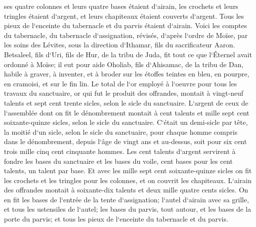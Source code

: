 \verse ses quatre colonnes et leurs quatre bases étaient d`airain, les crochets et leurs tringles étaient d`argent, et leurs chapiteaux étaient couverts d`argent. 
\verse Tous les pieux de l`enceinte du tabernacle et du parvis étaient d`airain. 
\verse Voici les comptes du tabernacle, du tabernacle d`assignation, révisés, d`après l`ordre de Moïse, par les soins des Lévites, sous la direction d`Ithamar, fils du sacrificateur Aaron. 
\verse Betsaleel, fils d`Uri, fils de Hur, de la tribu de Juda, fit tout ce que l`Éternel avait ordonné à Moïse; 
\verse il eut pour aide Oholiab, fils d`Ahisamac, de la tribu de Dan, habile à graver, à inventer, et à broder sur les étoffes teintes en bleu, en pourpre, en cramoisi, et sur le fin lin. 
\verse Le total de l`or employé à l`oeuvre pour tous les travaux du sanctuaire, or qui fut le produit des offrandes, montait à vingt-neuf talents et sept cent trente sicles, selon le sicle du sanctuaire. 
\verse L`argent de ceux de l`assemblée dont on fit le dénombrement montait à cent talents et mille sept cent soixante-quinze sicles, selon le sicle du sanctuaire. 
\verse C`était un demi-sicle par tête, la moitié d`un sicle, selon le sicle du sanctuaire, pour chaque homme compris dans le dénombrement, depuis l`âge de vingt ans et au-dessus, soit pour six cent trois mille cinq cent cinquante hommes. 
\verse Les cent talents d`argent servirent à fondre les bases du sanctuaire et les bases du voile, cent bases pour les cent talents, un talent par base. 
\verse Et avec les mille sept cent soixante-quinze sicles on fit les crochets et les tringles pour les colonnes, et on couvrit les chapiteaux. 
\verse L`airain des offrandes montait à soixante-dix talents et deux mille quatre cents sicles. 
\verse On en fit les bases de l`entrée de la tente d`assignation; l`autel d`airain avec sa grille, et tous les ustensiles de l`autel; 
\verse les bases du parvis, tout autour, et les bases de la porte du parvis; et tous les pieux de l`enceinte du tabernacle et du parvis. 

